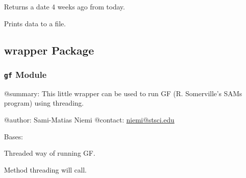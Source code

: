 \documentclass[letterpaper,10pt,english]{sphinxmanual}
\begin{document}
\begin{fulllineitems}
\label{SamPy.stis:SamPy.stis.STISmonthly.getMonth}
Returns a date 4 weeks ago from today.

\end{fulllineitems}



\begin{fulllineitems}
\label{SamPy.stis:SamPy.stis.STISmonthly.saveDataToFile}
Prints data to a file.

\end{fulllineitems}



\subsection{wrapper Package}
\label{SamPy.wrapper:wrapper-package}\label{SamPy.wrapper::doc}

\subsubsection{\texttt{gf} Module}
\label{SamPy.wrapper:module-SamPy.wrapper.gf}\label{SamPy.wrapper:gf-module}
@summary: This little wrapper can be used to
run GF (R. Somerville's SAMs program) using
threading.

@author: Sami-Matias Niemi
@contact: \href{mailto:niemi@stsci.edu}{niemi@stsci.edu}


\begin{fulllineitems}
\label{SamPy.wrapper:SamPy.wrapper.gf.Run_GF_Threaded}
Bases: 

Threaded way of running GF.


\begin{fulllineitems}
\label{SamPy.wrapper:SamPy.wrapper.gf.Run_GF_Threaded.run}
Method threading will call.

\end{fulllineitems}


\end{fulllineitems}
\end{document}
